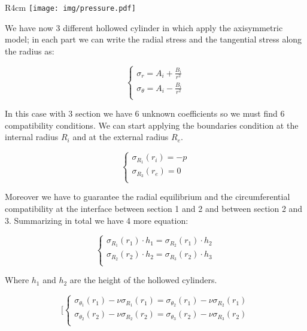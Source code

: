 \documentclass[a4paper,12pt]{article}
\begin{document}

\begin{wrapfigure}{R}{4cm}
\vspace{-0.0cm}
\texttt{[image: img/pressure.pdf]}
\end{wrapfigure}

We have now 3 different hollowed cylinder in which apply the axisymmetric model; in each part we can write the radial stress and the tangential stress along the radius as:

\begin{equation}
\begin{cases}{}
\sigma_r = A_i + \frac{B_i}{r^2} \\ 
\sigma_{\theta} = A_i - \frac{B_i}{r^2} \\ 
\end{cases}
\label{sigma_r_theta} 
\end{equation}

In this case with 3 section we have 6 unknown coefficients so we must find 6 compatibility conditions.
We can start applying the boundaries condition at the internal radius $R_i$ and at the external radius $R_e$.

\[\begin{cases}{}
\sigma_{R_1}(r_i) = -p \\ 
\sigma_{R_3}(r_e) = 0 \\ 
\end{cases}\]

Moreover we have to guarantee the radial equilibrium and the circumferential compatibility at the interface between section 1 and 2 and between section 2 and 3. Summarizing in total we have 4 more equation:

\[\begin{cases}{}
\sigma_{R_1}(r_1)\cdot h_1 = \sigma_{R_2}(r_1)\cdot h_2  \\ 
\sigma_{R_2}(r_2)\cdot h_2 = \sigma_{R_3}(r_2)\cdot h_3  \\ 
\end{cases}\]

Where $h_1$ and $h_2$ are the height of the hollowed cylinders.

\begin{equation}
[\begin{cases}{}
\sigma_{\theta_1}(r_1)-\nu\sigma_{R_1}(r_1) = \sigma_{\theta_2}(r_1)-\nu\sigma_{R_2}(r_1) \\ 
\sigma_{\theta_2}(r_2)-\nu\sigma_{R_2}(r_2) = \sigma_{\theta_3}(r_2)-\nu\sigma_{R_3}(r_2) \\ 
\end{cases}
\end{equation}
\end{document}
